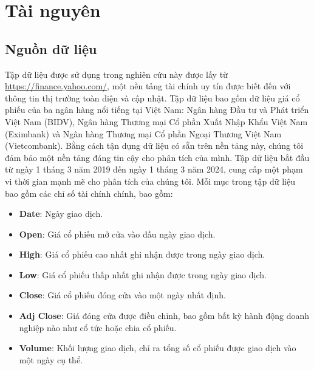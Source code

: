 \section{Tài nguyên}
\subsection{Nguồn dữ liệu}
Tập dữ liệu được sử dụng trong nghiên cứu này được lấy từ \underline{https://finance.yahoo.com/}, một nền tảng tài chính uy tín được biết đến với thông tin thị trường toàn diện và cập nhật. Tập dữ liệu bao gồm dữ liệu giá cổ phiếu của ba ngân hàng nổi tiếng tại Việt Nam: Ngân hàng Đầu tư và Phát triển Việt Nam (BIDV), Ngân hàng Thương mại Cổ phần Xuất Nhập Khẩu Việt Nam (Eximbank) và Ngân hàng Thương mại Cổ phần Ngoại Thương Việt Nam (Vietcombank). Bằng cách tận dụng dữ liệu có sẵn trên nền tảng này, chúng tôi đảm bảo một nền tảng đáng tin cậy cho phân tích của mình. Tập dữ liệu bắt đầu từ ngày 1 tháng 3 năm 2019 đến ngày 1 tháng 3 năm 2024, cung cấp một phạm vi thời gian mạnh mẽ cho phân tích của chúng tôi. Mỗi mục trong tập dữ liệu bao gồm các chỉ số tài chính chính, bao gồm:
\begin{itemize}
\item \textbf{Date}: Ngày giao dịch.
\item \textbf{Open}: Giá cổ phiếu mở cửa vào đầu ngày giao dịch.
\item \textbf{High}: Giá cổ phiếu cao nhất ghi nhận được trong ngày giao dịch.
\item \textbf{Low}: Giá cổ phiếu thấp nhất ghi nhận được trong ngày giao dịch.
\item \textbf{Close}: Giá cổ phiếu đóng cửa vào một ngày nhất định.
\item \textbf{Adj Close}: Giá đóng cửa được điều chỉnh, bao gồm bất kỳ hành động doanh nghiệp nào như cổ tức hoặc chia cổ phiếu.
\item \textbf{Volume}: Khối lượng giao dịch, chỉ ra tổng số cổ phiếu được giao dịch vào một ngày cụ thể.
\end{itemize}

